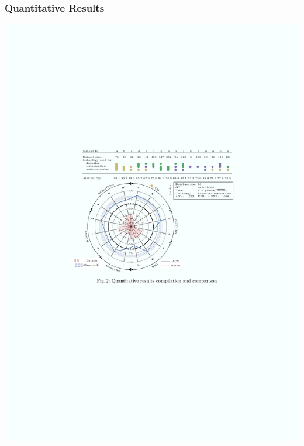 \begin{frame}[plain]\frametitle{Quantitative Results}
\includegraphics[trim=100 340 100 250,clip, height=.7\textheight]{quant.pdf} 
\end{frame}
